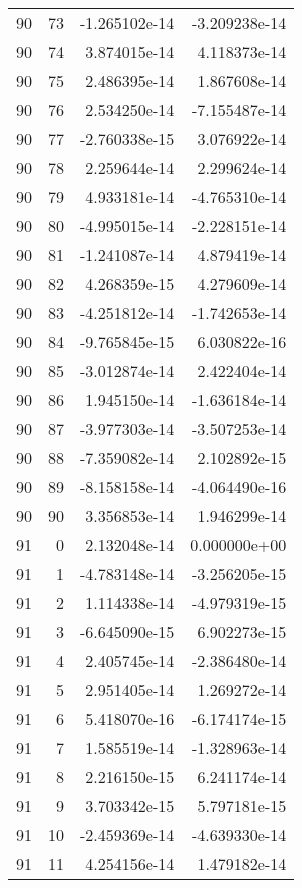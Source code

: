 \begin{tabular}{rrrr}
  90 &   73 & -1.265102e-14 & -3.209238e-14 \\
  90 &   74 &  3.874015e-14 &  4.118373e-14 \\
  90 &   75 &  2.486395e-14 &  1.867608e-14 \\
  90 &   76 &  2.534250e-14 & -7.155487e-14 \\
  90 &   77 & -2.760338e-15 &  3.076922e-14 \\
  90 &   78 &  2.259644e-14 &  2.299624e-14 \\
  90 &   79 &  4.933181e-14 & -4.765310e-14 \\
  90 &   80 & -4.995015e-14 & -2.228151e-14 \\
  90 &   81 & -1.241087e-14 &  4.879419e-14 \\
  90 &   82 &  4.268359e-15 &  4.279609e-14 \\
  90 &   83 & -4.251812e-14 & -1.742653e-14 \\
  90 &   84 & -9.765845e-15 &  6.030822e-16 \\
  90 &   85 & -3.012874e-14 &  2.422404e-14 \\
  90 &   86 &  1.945150e-14 & -1.636184e-14 \\
  90 &   87 & -3.977303e-14 & -3.507253e-14 \\
  90 &   88 & -7.359082e-14 &  2.102892e-15 \\
  90 &   89 & -8.158158e-14 & -4.064490e-16 \\
  90 &   90 &  3.356853e-14 &  1.946299e-14 \\
  91 &    0 &  2.132048e-14 &  0.000000e+00 \\
  91 &    1 & -4.783148e-14 & -3.256205e-15 \\
  91 &    2 &  1.114338e-14 & -4.979319e-15 \\
  91 &    3 & -6.645090e-15 &  6.902273e-15 \\
  91 &    4 &  2.405745e-14 & -2.386480e-14 \\
  91 &    5 &  2.951405e-14 &  1.269272e-14 \\
  91 &    6 &  5.418070e-16 & -6.174174e-15 \\
  91 &    7 &  1.585519e-14 & -1.328963e-14 \\
  91 &    8 &  2.216150e-15 &  6.241174e-14 \\
  91 &    9 &  3.703342e-15 &  5.797181e-15 \\
  91 &   10 & -2.459369e-14 & -4.639330e-14 \\
  91 &   11 &  4.254156e-14 &  1.479182e-14 \\

\end{tabular}
